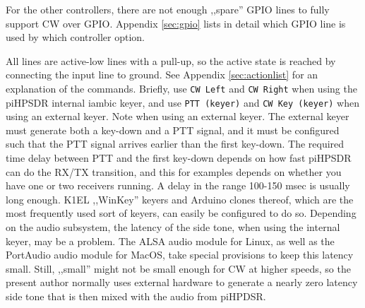 \documentclass[12pt]{book}
\def\bltt#1{\texttt{\color{blue}#1}}
\def\pH{pi\-HPSDR }
\begin{document}
For the other controllers, there are not enough ,,spare'' GPIO lines to fully
support CW over GPIO. Appendix \ref{sec:gpio} lists in detail which GPIO line
is used by which controller option.

All lines are active-low lines with a pull-up, so the active state is reached
by connecting the input line to ground. See Appendix \ref{sec:actionlist} for
an explanation of the commands. Briefly, use \bltt{CW Left} and \bltt{CW Right}
when using the \pH internal iambic keyer, and use \bltt{PTT (keyer)} and
\bltt{CW Key (keyer)} when using an external keyer. Note when using an external
keyer. The external keyer must generate both a key-down and a PTT signal, and it must be configured
such that the PTT signal arrives earlier than the first key-down. The required time
delay between PTT and the first key-down depends  on how fast \pH can do the
RX/TX transition, and this for examples depends on whether you have one or two receivers
running. A delay in the range 100-150 msec is usually long enough.
K1EL ,,WinKey'' keyers and Arduino clones thereof, which are the most frequently
used sort
of keyers, can easily be configured to do so. Depending on the audio subsystem,
the latency of the side tone, when using the internal keyer, may be a problem.
The ALSA audio module for Linux, as well as the PortAudio audio  module for MacOS,
 take special provisions to keep this latency small. Still, ,,small'' might not
 be small enough for CW at higher speeds, so the present author normally uses
 external hardware to generate a nearly zero latency side tone that is then
 mixed with the audio from piHPDSR.
\end{document}

